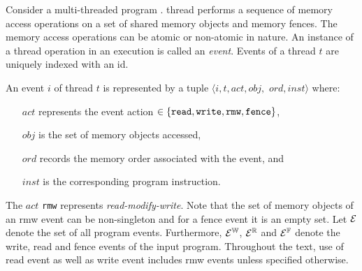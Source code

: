 Consider a multi-threaded \cc
program . 
  thread 
performs a sequence of memory access operations on a set of shared
memory objects and \cc memory fences.  The memory access operations
can be atomic or non-atomic in nature.
%
An instance of a thread operation in an execution is called an {\em
event}.  Events of a thread $t$ are uniquely indexed with an id.
%
\begin{definition}[Event]\newline
An event $i$ of thread $t$ is represented by a tuple $\langle i, t, act, obj,$ $ ord, inst \rangle$ where:
\begin{itemize}[label=inst,align=left,leftmargin=*]
\item [$act$] represents the event action $\in \{ \text{\tt read}, \text{\tt write}, \text{\tt rmw}, \text{\tt fence} \} $,
\item [$obj$] is the set of memory objects accessed,
\item [$ord$] records the \cc memory order associated with the event, and
\item [$inst$] is the corresponding program instruction.
\end{itemize}
\end{definition}
The $act$ {\tt rmw} represents {\em read-modify-write}.
%
Note that the set of memory objects of an rmw event can be non-singleton 
and for a fence event it is an empty set.
%
Let $\mathcal{E}$ denote the set of all program events. Furthermore,
$\mathcal{E}^{\mathbb{W}}$, $\mathcal{E}^{\mathbb{R}}$ and $\mathcal{E}^{\mathbb{F}}$ denote the write, read and fence 
events of the input program.
%
Throughout the text, use of read event as well as write event includes rmw
events unless specified otherwise.
%
